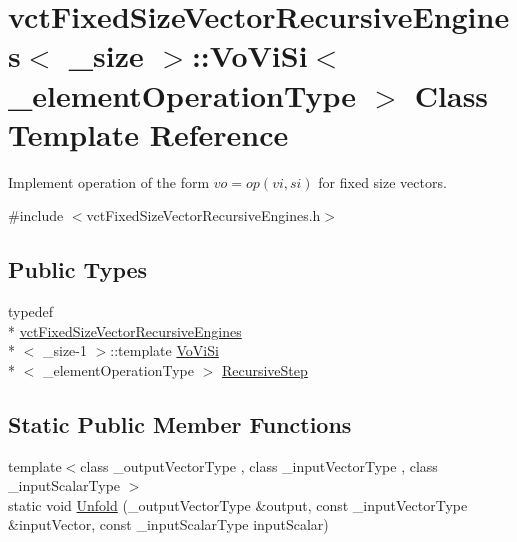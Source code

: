 \hypertarget{classvct_fixed_size_vector_recursive_engines_1_1_vo_vi_si}{\section{vct\-Fixed\-Size\-Vector\-Recursive\-Engines$<$ \-\_\-size $>$\-:\-:Vo\-Vi\-Si$<$ \-\_\-element\-Operation\-Type $>$ Class Template Reference}
\label{classvct_fixed_size_vector_recursive_engines_1_1_vo_vi_si}
}


Implement operation of the form $vo = op(vi, si)$ for fixed size vectors.  




{\ttfamily \#include $<$vct\-Fixed\-Size\-Vector\-Recursive\-Engines.\-h$>$}

\subsection*{Public Types}
\begin{DoxyCompactItemize}
\item 
typedef \\*
\hyperlink{classvct_fixed_size_vector_recursive_engines}{vct\-Fixed\-Size\-Vector\-Recursive\-Engines}\\*
$<$ \-\_\-size-\/1 $>$\-::template \hyperlink{classvct_fixed_size_vector_recursive_engines_1_1_vo_vi_si}{Vo\-Vi\-Si}\\*
$<$ \-\_\-element\-Operation\-Type $>$ \hyperlink{classvct_fixed_size_vector_recursive_engines_1_1_vo_vi_si_accec4105549a16640771c23dad79ac30}{Recursive\-Step}
\end{DoxyCompactItemize}
\subsection*{Static Public Member Functions}
\begin{DoxyCompactItemize}
\item 
{\footnotesize template$<$class \-\_\-output\-Vector\-Type , class \-\_\-input\-Vector\-Type , class \-\_\-input\-Scalar\-Type $>$ }\\static void \hyperlink{classvct_fixed_size_vector_recursive_engines_1_1_vo_vi_si_a77d53351e3af513b9aab368e14ca65ea}{Unfold} (\-\_\-output\-Vector\-Type \&output, const \-\_\-input\-Vector\-Type \&input\-Vector, const \-\_\-input\-Scalar\-Type input\-Scalar)
\end{DoxyCompactItemize}


